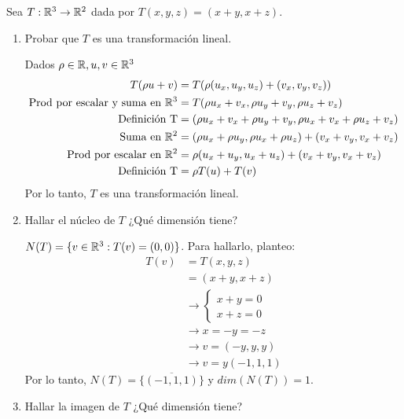 \item Sea $T:\mathbb{R}^3\to\mathbb{R}^2$ dada por $T(x,y,z)=(x+y,x+z)$.
    \begin{enumerate}
        \item Probar que $T$ es una transformación lineal.
            \begin{mdframed}[style=s]
                Dados $\rho\in\mathbb{R},u,v\in\mathbb{R}^3$
                \begin{align*}
                    T(\rho u+v)&=T(\rho(u_x,u_y,u_z)+(v_x,v_y,v_z))\\
                    \text{Prod por escalar y suma en }\mathbb{R}^3&=T(\rho u_x+v_x,\rho u_y+v_y,\rho u_z+v_z)\\
                    \text{Definición T}&=(\rho u_x+v_x+\rho u_y+v_y,\rho u_x+v_x+\rho u_z+v_z)\\
                    \text{Suma en }\mathbb{R}^2&=(\rho u_x+\rho u_y,\rho u_x+\rho u_z)+(v_x+v_y,v_x+v_z)\\
                    \text{Prod por escalar en }\mathbb{R}^2&=\rho(u_x+u_y,u_x+u_z)+(v_x+v_y,v_x+v_z)\\
                    \text{Definición T}&=\rho T(u)+T(v)
                \end{align*}
                Por lo tanto, $T$ es una transformación lineal.
            \end{mdframed}
        \item Hallar el núcleo de $T$ ¿Qué dimensión tiene?\pagebreak
            \begin{mdframed}[style=s]
                $N(T)=\{v\in\mathbb{R}^3:T(v)=(0,0)\}$. Para hallarlo, planteo:
                \begin{align*}
                    T(v)&=T(x,y,z)\\
                    &=(x+y,x+z)\\
                    &\to\begin{cases}
                        x+y=0\\
                        x+z=0
                    \end{cases}\\
                    &\to x=-y=-z\\
                    &\to v=(-y,y,y)\\
                    &\to v=y(-1,1,1)
                \end{align*}
                Por lo tanto, $N(T)=\overline{\{(-1,1,1)\}}$ y $dim(N(T))=1$.
            \end{mdframed}
        \item Hallar la imagen de $T$ ¿Qué dimensión tiene?

\end{enumerate}
